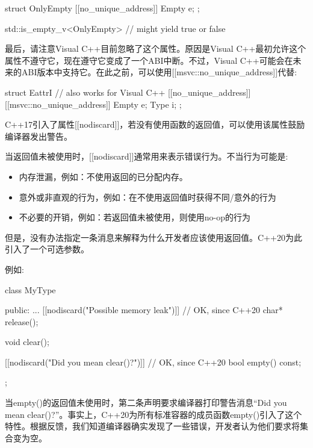 \begin{cpp}
struct OnlyEmpty {
	[[no_unique_address]] Empty e;
};

std::is_empty_v<OnlyEmpty> // might yield true or false
\end{cpp}

最后，请注意Visual C++目前忽略了这个属性。原因是Visual C++最初允许这个属性不遵守它，现在遵守它变成了一个ABI中断。不过，Visual C++可能会在未来的ABI版本中支持它。在此之前，可以使用[[msvc::no\_unique\_address]]代替:

\begin{cpp}
struct EattrI { // also works for Visual C++
	[[no_unique_address]] [[msvc::no_unique_address]] Empty e;
	Type i;
};
\end{cpp}


C++17引入了属性[[nodiscard]]，若没有使用函数的返回值，可以使用该属性鼓励编译器发出警告。

当返回值未被使用时，[[nodiscard]]通常用来表示错误行为。不当行为可能是:

\begin{itemize}
\item 
内存泄漏，例如：不使用返回的已分配内存。

\item 
意外或非直观的行为，例如：在不使用返回值时获得不同/意外的行为

\item 
不必要的开销，例如：若返回值未被使用，则使用no-op的行为
\end{itemize}

但是，没有办法指定一条消息来解释为什么开发者应该使用返回值。C++20为此引入了一个可选参数。

例如:

\begin{cpp}
class MyType {
	public:
	...
	[[nodiscard("Possible memory leak")]] // OK, since C++20
	char* release();
	
	void clear();
	
	[[nodiscard("Did you mean clear()?")]] // OK, since C++20
	bool empty() const;
};
\end{cpp}

当empty()的返回值未使用时，第二条声明要求编译器打印警告消息“Did you mean clear()?”。事实上，C++20为所有标准容器的成员函数empty()引入了这个特性。根据反馈，我们知道编译器确实发现了一些错误，开发者认为他们要求将集合变为空。



